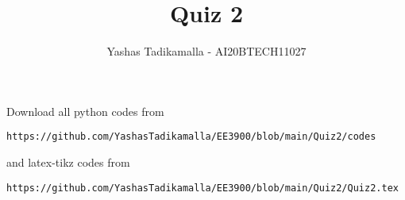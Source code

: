 \documentclass[journal,12pt,twocolumn]{IEEEtran}
\DeclareMathOperator*{\Res}{Res}
\begin{document}
\newcommand{\BEQA}{\begin{eqnarray}}
\newcommand{\EEQA}{\end{eqnarray}}
\newcommand{\define}{\stackrel{\triangle}{=}}

\raggedbottom
\setlength{\parindent}{0pt}
\providecommand{\mbf}{\mathbf}
\providecommand{\pr}[1]{\ensuremath{\Pr\left(#1\right)}}
\providecommand{\qfunc}[1]{\ensuremath{Q\left(#1\right)}}
\providecommand{\sbrak}[1]{\ensuremath{{}\left[#1\right]}}
\providecommand{\lsbrak}[1]{\ensuremath{{}\left[#1\right.}}
\providecommand{\rsbrak}[1]{\ensuremath{{}\left.#1\right]}}
\providecommand{\brak}[1]{\ensuremath{\left(#1\right)}}
\providecommand{\lbrak}[1]{\ensuremath{\left(#1\right.}}
\providecommand{\rbrak}[1]{\ensuremath{\left.#1\right)}}
\providecommand{\cbrak}[1]{\ensuremath{\left\{#1\right\}}}
\providecommand{\lcbrak}[1]{\ensuremath{\left\{#1\right.}}
\providecommand{\rcbrak}[1]{\ensuremath{\left.#1\right\}}}
\theoremstyle{remark}
\newtheorem{rem}{Remark}
\newtheorem*{remark}{Remark}
\newcommand{\sgn}{\mathop{\mathrm{sgn}}}
\providecommand{\abs}[1]{\vert#1\vert}
\providecommand{\res}[1]{\Res\displaylimits_{#1}} 
\providecommand{\norm}[1]{\lVert#1\rVert}
\providecommand{\mtx}[1]{\mathbf{#1}}
\providecommand{\mean}[1]{E[ #1 ]}
\providecommand{\fourier}{\overset{\mathcal{F}}{ \rightleftharpoons}}
\providecommand{\system}{\overset{\mathcal{H}}{ \longleftrightarrow}}
\newcommand{\solution}{\noindent \textbf{Solution: }}
\newcommand{\cosec}{\,\text{cosec}\,}
\providecommand{\dec}[2]{\ensuremath{\overset{#1}{\underset{#2}{\gtrless}}}}
\newcommand{\myvec}[1]{\ensuremath{\begin{pmatrix}#1\end{pmatrix}}}
\newcommand{\mydet}[1]{\ensuremath{\begin{vmatrix}#1\end{vmatrix}}}
\makeatletter
{}
\makeatother
\let\StandardTheFigure\thefigure
\let\vec\mathbf
\renewcommand{\thefigure}{\theproblem}
\def\putbox#1#2#3{\makebox[0in][l]{\makebox[#1][l]{}\raisebox{\baselineskip}[0in][0in]{\raisebox{#2}[0in][0in]{#3}}}}
     \def\rightbox#1{\makebox[0in][r]{#1}}
     \def\centbox#1{\makebox[0in]{#1}}
     \def\topbox#1{\raisebox{-\baselineskip}[0in][0in]{#1}}
     \def\midbox#1{\raisebox{-0.5\baselineskip}[0in][0in]{#1}}
\vspace{3cm}
\title{Quiz 2}
\author{Yashas Tadikamalla - AI20BTECH11027}
\maketitle
\newpage
\bigskip
\renewcommand{\thefigure}{\theenumi}
\renewcommand{\thetable}{\theenumi}
Download all python codes from 
\begin{lstlisting}
https://github.com/YashasTadikamalla/EE3900/blob/main/Quiz2/codes
\end{lstlisting}
%
and latex-tikz codes from 
%
\begin{lstlisting}
https://github.com/YashasTadikamalla/EE3900/blob/main/Quiz2/Quiz2.tex
\end{lstlisting}
\end{document}
